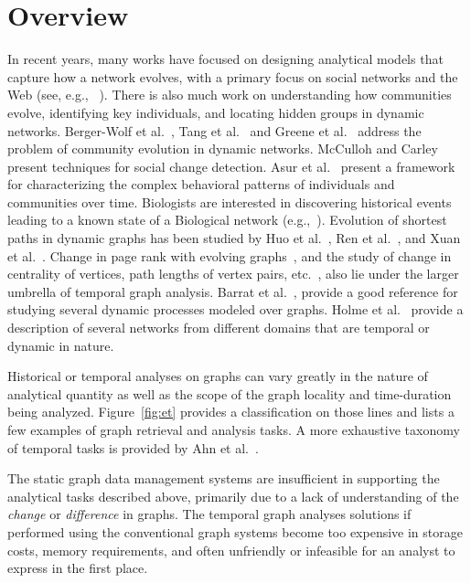 \documentclass{svjour3}
\begin{document}
\section{Overview}
In recent years, many works have focused on designing analytical models that capture how a network evolves, with a primary focus on
social networks and the Web (see, e.g., ~\cite{LeskovecKF07,Kumar:2006:SEO:1150402.1150476}).
There is also much work on understanding how communities evolve, identifying key individuals,
and locating hidden groups in dynamic networks. Berger-Wolf et
al.~\cite{Berger-Wolf2006,tantipathananandh2007framework},  
Tang et al.~\cite{tang2008community} and Greene et al.~\cite{Greene2010} 
address the problem of community evolution in
dynamic networks.
McCulloh and Carley~\cite{McCulloh2008} present techniques for social change detection.
Asur et al.~\cite{Asur2009} present a framework for characterizing the complex behavioral patterns
of individuals and communities over time. %
Biologists are interested in discovering historical events leading to a 
known state of a Biological network (e.g.,~\cite{10.1371/journal.pcbi.1001119}).
Evolution of shortest paths in dynamic
graphs has been studied by Huo et al.~\cite{huo2014efficient}, Ren et al.~\cite{RenEvolvGraph11},
and Xuan et al.~\cite{xuan2003computing}. Change in page rank with evolving graphs~\cite{desikan2005incremental,bahmani2010fast}, and
the study of change in centrality of vertices, path lengths of vertex pairs,
etc.~\cite{pan2011path}, also lie under the larger umbrella of temporal graph analysis.
Barrat et al.~\cite{barrat2008dynamical}, provide a good reference for studying several
dynamic processes modeled over graphs. Holme et al.~\cite{holme2012temporal} provide a description of several networks from different domains that 
are temporal or dynamic in nature. 

Historical or temporal analyses on graphs can vary greatly in the nature of analytical quantity as well as the scope of the graph locality and time-duration being analyzed. 
Figure~\ref{fig:et} provides a classification on those lines and lists a few examples of graph retrieval and analysis tasks.
A more exhaustive taxonomy of temporal tasks is provided by Ahn et al.~\cite{ahn2014task}.

The static graph data management systems are insufficient in supporting the analytical tasks described above, primarily due to a lack of understanding of the {\em change} or {\em difference} in graphs. The temporal graph analyses solutions if performed using the conventional graph systems become too expensive in storage costs, memory requirements, and often unfriendly or infeasible for an analyst to express in the first place. 
\end{document}
